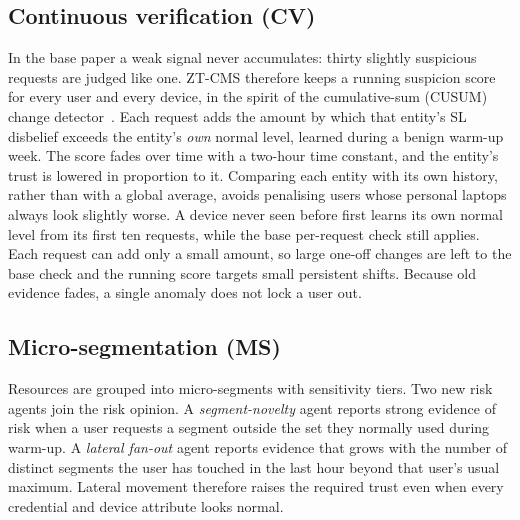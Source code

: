\documentclass[conference,a4paper]{IEEEtran}
\begin{document}
\subsection{Continuous verification (CV)}
In the base paper a weak signal never accumulates: thirty slightly suspicious requests are judged like one. ZT-CMS therefore keeps a running suspicion score for every user and every device, in the spirit of the cumulative-sum (CUSUM) change detector~\cite{page}. Each request adds the amount by which that entity's SL disbelief exceeds the entity's \emph{own} normal level, learned during a benign warm-up week. The score fades over time with a two-hour time constant, and the entity's trust is lowered in proportion to it. Comparing each entity with its own history, rather than with a global average, avoids penalising users whose personal laptops always look slightly worse. A device never seen before first learns its own normal level from its first ten requests, while the base per-request check still applies. Each request can add only a small amount, so large one-off changes are left to the base check and the running score targets small persistent shifts. Because old evidence fades, a single anomaly does not lock a user out.

\subsection{Micro-segmentation (MS)}
Resources are grouped into micro-segments with sensitivity tiers. Two new risk agents join the risk opinion. A \emph{segment-novelty} agent reports strong evidence of risk when a user requests a segment outside the set they normally used during warm-up. A \emph{lateral fan-out} agent reports evidence that grows with the number of distinct segments the user has touched in the last hour beyond that user's usual maximum. Lateral movement therefore raises the required trust even when every credential and device attribute looks normal.
\end{document}
